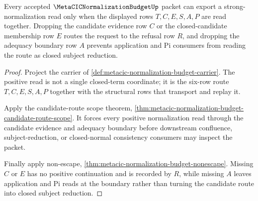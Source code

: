 \begin{theorem}
\label{thm:metacic-normalization-budget-candidate-sn-boundary}
Every accepted $\MetaCICNormalizationBudgetUp$ packet can export a strong-normalization read only when the displayed rows $T,C,E,S,A,P$ are read together. Dropping the candidate evidence row $C$ or the closed-candidate membership row $E$ routes the request to the refusal row $R$, and dropping the adequacy boundary row $A$ prevents application and Pi consumers from reading the route as closed subject reduction.
\end{theorem}
\begin{proof}
Project the carrier of \autoref{def:metacic-normalization-budget-carrier}. The positive read is not a single closed-term coordinate; it is the six-row route $T,C,E,S,A,P$ together with the structural rows that transport and replay it.

Apply the candidate-route scope theorem, \autoref{thm:metacic-normalization-budget-candidate-route-scope}. It forces every positive normalization read through the candidate evidence and adequacy boundary before downstream confluence, subject-reduction, or closed-normal consistency consumers may inspect the packet.

Finally apply non-escape, \autoref{thm:metacic-normalization-budget-nonescape}. Missing $C$ or $E$ has no positive continuation and is recorded by $R$, while missing $A$ leaves application and Pi reads at the boundary rather than turning the candidate route into closed subject reduction.
\end{proof}

